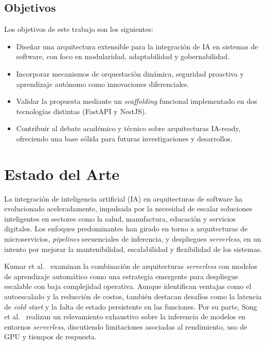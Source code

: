 \documentclass[a4paper]{llncs}
\begin{document}
\subsection*{Objetivos}

Los objetivos de este trabajo son los siguientes:

\begin{itemize}
    \item Diseñar una arquitectura extensible para la integración de IA en sistemas de software, con foco en modularidad, adaptabilidad y gobernabilidad.
    \item Incorporar mecanismos de orquestación dinámica, seguridad proactiva y aprendizaje autónomo como innovaciones diferenciales.
    \item Validar la propuesta mediante un \emph{scaffolding} funcional implementado en dos tecnologías distintas (FastAPI y NestJS).
    \item Contribuir al debate académico y técnico sobre arquitecturas IA-ready, ofreciendo una base sólida para futuras investigaciones y desarrollos.
\end{itemize}



\section{Estado del Arte}

La integración de inteligencia artificial (IA) en arquitecturas de software ha evolucionado aceleradamente, impulsada por la necesidad de escalar soluciones inteligentes en sectores como la salud, manufactura, educación y servicios digitales. Los enfoques predominantes han girado en torno a arquitecturas de microservicios, \textit{pipelines} secuenciales de inferencia, y despliegues \textit{serverless}, en un intento por mejorar la mantenibilidad, escalabilidad y flexibilidad de los sistemas.

Kumar et al.~\cite{kumar2024serverlessai} examinan la combinación de arquitecturas \textit{serverless} con modelos de aprendizaje automático como una estrategia emergente para despliegue escalable con baja complejidad operativa. Aunque identifican ventajas como el autoescalado y la reducción de costos, también destacan desafíos como la latencia de \textit{cold start} y la falta de estado persistente en las funciones. Por su parte, Song et al.~\cite{song2023surveyserverless} realizan un relevamiento exhaustivo sobre la inferencia de modelos en entornos \textit{serverless}, discutiendo limitaciones asociadas al rendimiento, uso de GPU y tiempos de respuesta.
\end{document}
